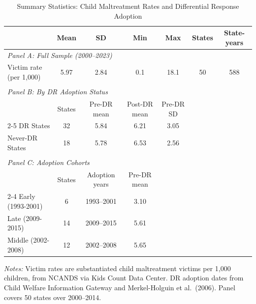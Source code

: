 \begin{table}[htbp]
\centering
\begin{threeparttable}
\caption{Summary Statistics: Child Maltreatment Rates and Differential Response Adoption}
\label{tab:summary}
\footnotesize
\begin{tabular}{lcccccc}
\toprule
 & Mean & SD & Min & Max & States & State-years \\
\midrule
\multicolumn{7}{l}{\textit{Panel A: Full Sample (2000--2023)}} \\[3pt]
Victim rate (per 1,000) & 5.97 & 2.84 & 0.1 & 18.1 & 50 & 588 \\
\\
\multicolumn{7}{l}{\textit{Panel B: By DR Adoption Status}} \\[3pt]
 & States & Pre-DR mean & Post-DR mean & Pre-DR SD & & \\
\cmidrule(lr){2-5}
DR States & 32 & 5.84 & 6.21 & 3.05 & & \\
Never-DR States & 18 & 5.78 & 6.53 & 2.56 & & \\
\\
\multicolumn{7}{l}{\textit{Panel C: Adoption Cohorts}} \\[3pt]
 & States & Adoption years & Pre-DR mean & & & \\
\cmidrule(lr){2-4}
Early (1993-2001) & 6 & 1993--2001 & 3.10 & & & \\
Late (2009-2015) & 14 & 2009--2015 & 5.61 & & & \\
Middle (2002-2008) & 12 & 2002--2008 & 5.65 & & & \\
\bottomrule
\end{tabular}
\begin{tablenotes}
\item \textit{Notes:} Victim rates are substantiated child maltreatment victims per 1,000 children, from NCANDS via Kids Count Data Center. DR adoption dates from Child Welfare Information Gateway and Merkel-Holguin et al.\ (2006). Panel covers 50 states over 2000--2014.
\end{tablenotes}
\end{threeparttable}
\end{table}
